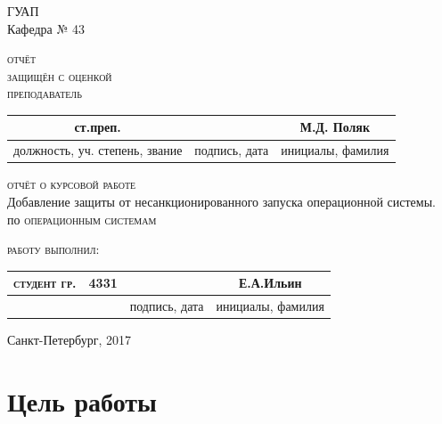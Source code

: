 \documentclass[a4paper]{article}
\begin{document}
 
\begin{center}
\hfill \break
\large{ГУАП}\\
\hfill \break
\normalsize{Кафедра № 43}\\
\hfill\break
\hfill \break
\begin{flushleft}
\textsc{отчёт}\\
\textsc{защищён с оценкой}\\
\textsc{преподаватель}\\
\end{flushleft}
\renewcommand{\arraystretch}{1} %
\renewcommand{\tabcolsep}{1cm}
\begin{center}
\begin{tabular}{ccc}
ст.преп. &  & М.Д. Поляк\\
\hline
\small{должность, уч. степень, звание} & \small{подпись, дата} & \small{инициалы, фамилия} \\
\hline
\end{tabular}
\end{center}
\hfill \break
\hfill \break
\textsc{отчёт о курсовой работе}\\
\hfill \break
\hfill \break
\hfill \break
\large{Добавление защиты от несанкционированного запуска операционной системы.}\\
\hfill \break
\hfill \break
\hfill \break
по \textsc{операционным системам}\\
\hfill \break
\hfill \break
\hfill \break
\begin{flushleft}
\textsc{работу выполнил:}
\end{flushleft}
\renewcommand{\arraystretch}{1} %
\renewcommand{\tabcolsep}{0,6cm}
\begin{tabular}{cccc}
\textsc{студент гр.} & 4331 & & Е.А.Ильин \\
\hline
& & \small{подпись, дата} & \small{инициалы, фамилия} \\
\end{tabular}
\end{center}
\hfill \break
\hfill \break
\begin{center} Санкт-Петербург, 2017 \end{center}
\thispagestyle{empty} %
 
 
\newpage

\section{Цель работы}
\end{document}
